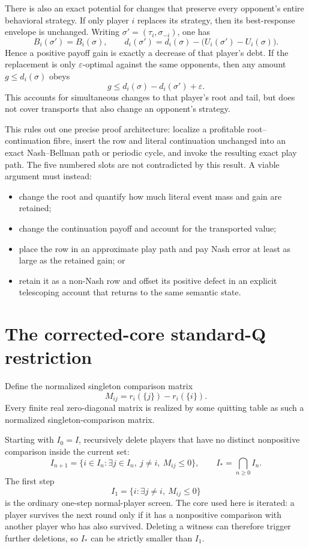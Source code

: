 \documentclass[11pt]{article}
\begin{document}
There is also an exact potential for changes that preserve every opponent's
entire behavioral strategy.  If only player $i$ replaces its strategy, then
its best-response envelope is unchanged.  Writing
$\sigma'=(\tau_i,\sigma_{-i})$, one has
\[
 B_i(\sigma')=B_i(\sigma),
 \qquad
 d_i(\sigma')=d_i(\sigma)-
   \bigl(U_i(\sigma')-U_i(\sigma)\bigr).
\]
Hence a positive payoff gain is exactly a decrease of that player's debt.
If the replacement is only $\varepsilon$-optimal against the same opponents,
then any amount $g\le d_i(\sigma)$ obeys
\[
 g\le d_i(\sigma)-d_i(\sigma')+\varepsilon.
\]
This accounts for simultaneous changes to that player's root and tail, but
does not cover transports that also change an opponent's strategy.

This rules out one precise proof architecture: localize a profitable
root--continuation fibre, insert the row and literal continuation unchanged
into an exact Nash--Bellman path or periodic cycle, and invoke the resulting
exact play path.  The five numbered slots
are not contradicted by this result.  A viable argument must instead:
\begin{itemize}
\item change the root and quantify how much literal event mass and gain are
      retained;
\item change the continuation payoff and account for the transported value;
\item place the row in an approximate play path and pay Nash error at least
      as large as the retained gain; or
\item retain it as a non-Nash row and offset its positive defect in an
      explicit telescoping account that returns to the same semantic state.
\end{itemize}

\section{The corrected-core standard-Q restriction}
\label{sec:corrected-core}

Define the normalized singleton comparison matrix
\[
 M_{ij}=r_i(\{j\})-r_i(\{i\}).
\]
Every finite real zero-diagonal matrix is realized by some quitting table as
such a normalized singleton-comparison matrix.

Starting with $I_0=I$, recursively delete players that have no distinct
nonpositive comparison inside the current set:
\[
 I_{n+1}=\{i\in I_n:\exists j\in I_n,
             \ j\ne i,\ M_{ij}\le0\},
 \qquad I_*=\bigcap_{n\ge0}I_n.
\]
The first step
\[
 I_1=\{i:\exists j\ne i,\ M_{ij}\le0\}
\]
is the ordinary one-step normal-player screen.  The core used here is
iterated: a player survives the next round only if it has a nonpositive
comparison with another player who has also survived.  Deleting a witness
can therefore trigger further deletions, so $I_*$ can be strictly smaller
than $I_1$.
\end{document}
